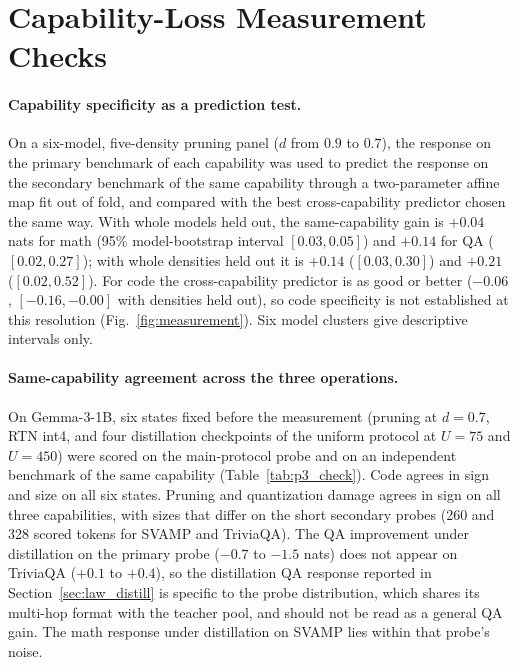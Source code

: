 \FloatBarrier
\section{Capability-Loss Measurement Checks}
\label{sec:app_measure}
\paragraph{Capability specificity as a prediction test.} On a
six-model, five-density pruning panel ($d$ from $0.9$ to $0.7$), the
response on the primary benchmark of each capability was used to
predict the response on the secondary benchmark of the same capability
through a two-parameter affine map fit out of fold, and compared with
the best cross-capability predictor chosen the same way. With whole
models held out, the same-capability gain is $+0.04$ nats for math
(95\% model-bootstrap interval $[0.03,0.05]$) and $+0.14$ for QA
($[0.02,0.27]$); with whole densities held out it is $+0.14$
($[0.03,0.30]$) and $+0.21$ ($[0.02,0.52]$). For code the
cross-capability predictor is as good or better ($-0.06$,
$[-0.16,-0.00]$ with densities held out), so code specificity is not
established at this resolution (Fig.~\ref{fig:measurement}). Six model clusters give descriptive
intervals only.



\paragraph{Same-capability agreement across the three operations.} On
Gemma-3-1B, six states fixed before the measurement (pruning at
$d=0.7$, RTN int4, and four distillation checkpoints of the uniform
protocol at $U=75$ and $U=450$) were scored on the main-protocol probe
and on an independent benchmark of the same capability
(Table~\ref{tab:p3_check}). Code agrees in sign and size on all six
states. Pruning and quantization damage agrees in sign on all three
capabilities, with sizes that differ on the short secondary probes
(260 and 328 scored tokens for SVAMP and TriviaQA). The QA improvement
under distillation on the primary probe ($-0.7$ to $-1.5$ nats) does
not appear on TriviaQA ($+0.1$ to $+0.4$), so the distillation QA
response reported in Section~\ref{sec:law_distill} is specific to the
probe distribution, which shares its multi-hop format with the teacher
pool, and should not be read as a general QA gain. The math response
under distillation on SVAMP lies within that probe's noise.


